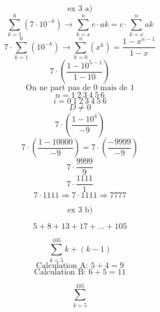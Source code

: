 \documentclass{article}
\begin{document}
\[ \text{ex 3 a)} \]
\[ \sum_{k=1}^{6} (7 \cdot 10^{-k}) \rightarrow \sum_{k=x}^{n} c \cdot ak = c \cdot \sum_{k=x}^{n} ak \]
\[ 7 \cdot \sum_{k=1}^{6} (10^{-k}) \rightarrow \sum_{k=0}^{n} (x^k) = \frac{1-x^{n-1}}{1-x} \]
\[ 7 \cdot \left( \frac{1-10^{5-1}}{1-10} \right) \]
\[ \text{On ne part pas de 0 mais de 1} \]
\[ n = 1 \ 2 \ 3 \ 4 \ 5 \ 6 \]
\[ i = 0 \ 1 \ 2 \ 3 \ 4 \ 5 \ 6 \]
\[ D \neq 0 \]
\[ 7 \cdot \left( \frac{1-10^{4}}{-9} \right) \]
\[ 7 \cdot \left( \frac{1-10000}{-9} \right) = 7 \cdot \left( \frac{-9999}{-9} \right) \]
\[ 7 \cdot \frac{9999}{9} \]
\[ 7 \cdot \frac{1111}{1} \]
\[ 7 \cdot 1111 \Rightarrow 7 \cdot 1111 \Rightarrow 7777 \]

\[ \text{ex 3 b)} \]

\[ 5 + 8 + 13 + 17 + \dots + 105 \]

\[ \sum_{k=5}^{105} k + (k-1) \]
\[ \text{Calculation A: } 5+4 = 9 \]
\[ \text{Calculation B: } 6+5 = 11 \]

\[ \sum_{k=5}^{105} \]
\end{document}
